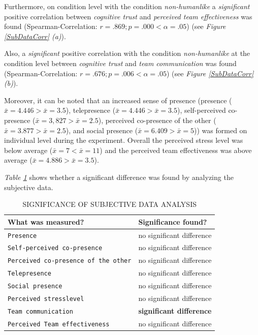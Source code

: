 \documentclass[sigchi]{acmart}
\begin{document}
Furthermore, on condition level with the condition \textit{non-humanlike} a \textit{significant} positive correlation between \textit{cognitive trust} and \textit{perceived team effectiveness} was found (Spearman-Correlation: $r =.869; p =.000 < \alpha = .05$) (see \textit{Figure \ref{SubDataCorr} (a)}).

Also, a \textit{significant} positive correlation with the condition \textit{non-humanlike} at the condition level between \textit{cognitive trust} and \textit{team communication} was found (Spearman-Correlation: $r =.676; p =.006 < \alpha = .05$) (see \textit{Figure \ref{SubDataCorr} (b)}).

Moreover, it can be noted that an increased sense of presence (presence ($\bar{x} = 4.446 > \bar{x} = 3.5$), telepresence ($\bar{x} = 4.446 > \bar{x} = 3.5$), self-perceived co-presence ($\bar{x} = 3, 827 > \bar{x} = 2.5$), perceived co-presence of the other ($\bar{x} = 3.877 > \bar{x} = 2.5$), and social presence ($\bar{x} = 6.409 > \bar{x} = 5$)) was formed on individual level during the experiment. Overall the perceived stress level was below average ($\bar{x} = 7 < \bar{x} = 11$) and the perceived team effectiveness was above average ($\bar{x} = 4.886 > \bar{x} = 3.5$).

\textit{Table \ref{SubDataSigs}} shows whether a significant difference was found by analyzing the subjective data.

\begin{table}
	\caption{SIGNIFICANCE OF SUBJECTIVE DATA ANALYSIS}
  \label{SubDataSigs}
  \begin{tabular}{ll}
    \toprule
    What was measured? & Significance found? \\
    \midrule
     \texttt{Presence} & no significant difference \\
   	 \texttt{Self-perceived co-presence} & no significant difference \\
     \texttt{Perceived co-presence of the other} & no significant difference  \\
     \texttt{Telepresence} & no significant difference \\
     \texttt{Social presence} & no significant difference \\
     \texttt{Perceived stresslevel} & no significant difference \\
     \texttt{Team communication} & \textbf{significant difference} \\
     \texttt{Perceived Team effectiveness} & no significant difference  \\
    \bottomrule
  \end{tabular}
\end{table}
\end{document}
